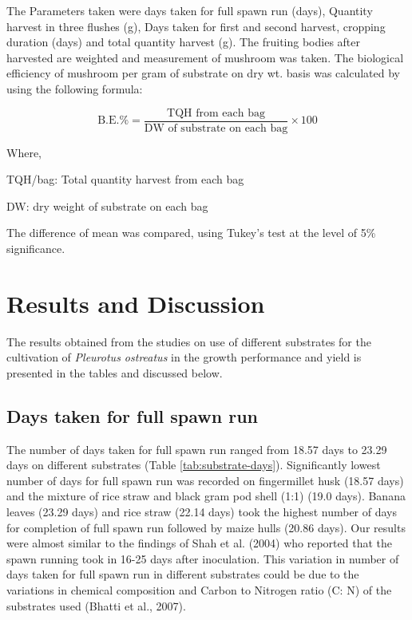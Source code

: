 \documentclass[]{elsarticle} %
\begin{document}
The Parameters taken were days taken for full spawn run (days), Quantity
harvest in three flushes (g), Days taken for first and second harvest,
cropping duration (days) and total quantity harvest (g). The fruiting
bodies after harvested are weighted and measurement of mushroom was
taken. The biological efficiency of mushroom per gram of substrate on
dry wt. basis was calculated by using the following formula:

\[
\textrm{B.E.} \% =\frac{\text{TQH from each bag}}{\textrm{DW of substrate on each bag}} \times 100
\]

Where,

TQH/bag: Total quantity harvest from each bag

DW: dry weight of substrate on each bag

The difference of mean was compared, using Tukey's test at the level of
5\% significance.

\hypertarget{results-and-discussion}{%
\section{Results and Discussion}\label{results-and-discussion}}

The results obtained from the studies on use of different substrates for
the cultivation of \textit{Pleurotus ostreatus} in the growth
performance and yield is presented in the tables and discussed below.

\hypertarget{days-taken-for-full-spawn-run}{%
\subsection{Days taken for full spawn
run}\label{days-taken-for-full-spawn-run}}

The number of days taken for full spawn run ranged from 18.57 days to
23.29 days on different substrates (Table \ref{tab:substrate-days}).
Significantly lowest number of days for full spawn run was recorded on
fingermillet husk (18.57 days) and the mixture of rice straw and black
gram pod shell (1:1) (19.0 days). Banana leaves (23.29 days) and rice
straw (22.14 days) took the highest number of days for completion of
full spawn run followed by maize hulls (20.86 days). Our results were
almost similar to the findings of Shah et al. (2004) who reported that
the spawn running took in 16-25 days after inoculation. This variation
in number of days taken for full spawn run in different substrates could
be due to the variations in chemical composition and Carbon to Nitrogen
ratio (C: N) of the substrates used (Bhatti et al., 2007).
\end{document}
